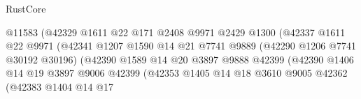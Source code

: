 \begin{lexlean}{RustCore}
\begin{coremodule}
                                            @11583
                                            (@42329
                                              @1611
                                              @22
                                              @171
                                              @2408
                                              @9971
                                              @2429
                                              @1300
                                              (@42337
                                                @1611
                                                @22
                                                @9971
                                                (@42341
                                                  @1207
                                                  @1590
                                                  @14
                                                  @21
                                                  @7741
                                                  @9889
                                                  (@42290 @1206 @7741 @30192 @30196)
                                                  (@42390
                                                    @1589
                                                    @14
                                                    @20
                                                    @3897
                                                    @9888
                                                    @42399
                                                    (@42390
                                                      @1406
                                                      @14
                                                      @19
                                                      @3897
                                                      @9006
                                                      @42399
                                                      (@42353
                                                        @1405
                                                        @14
                                                        @18
                                                        @3610
                                                        @9005
                                                        @42362
                                                        (@42383
                                                          @1404
                                                          @14
                                                          @17

\end{coremodule}
\end{lexlean}
